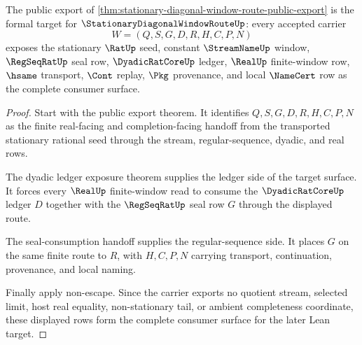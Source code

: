 \begin{theorem}
\label{thm:stationary-diagonal-window-route-formal-target}
The public export of \autoref{thm:stationary-diagonal-window-route-public-export} is the formal target for $\StationaryDiagonalWindowRouteUp$: every accepted carrier
$$
W=(Q,S,G,D,R,H,C,P,N)
$$
exposes the stationary $\RatUp$ seed, constant $\StreamNameUp$ window, $\RegSeqRatUp$ seal row, $\DyadicRatCoreUp$ ledger, $\RealUp$ finite-window row, $\hsame$ transport, $\Cont$ replay, $\Pkg$ provenance, and local $\NameCert$ row as the complete consumer surface.
\end{theorem}
\begin{proof}
Start with the public export theorem. It identifies $Q,S,G,D,R,H,C,P,N$ as the finite real-facing and completion-facing handoff from the transported stationary rational seed through the stream, regular-sequence, dyadic, and real rows.

The dyadic ledger exposure theorem supplies the ledger side of the target surface. It forces every $\RealUp$ finite-window read to consume the $\DyadicRatCoreUp$ ledger $D$ together with the $\RegSeqRatUp$ seal row $G$ through the displayed route.

The seal-consumption handoff supplies the regular-sequence side. It places $G$ on the same finite route to $R$, with $H,C,P,N$ carrying transport, continuation, provenance, and local naming.

Finally apply non-escape. Since the carrier exports no quotient stream, selected limit, host real equality, non-stationary tail, or ambient completeness coordinate, these displayed rows form the complete consumer surface for the later Lean target.
\end{proof}


